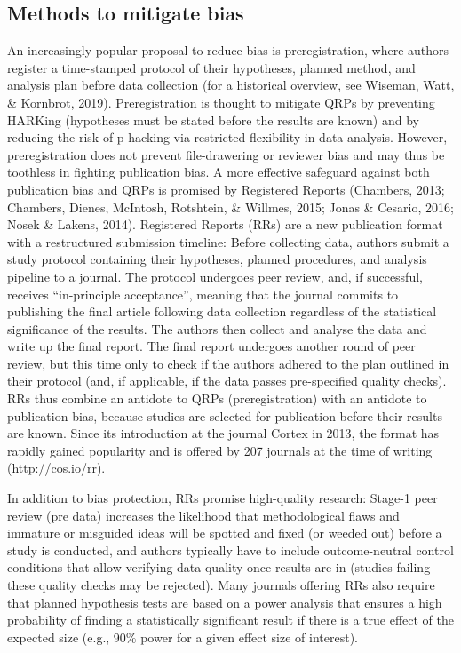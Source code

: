 \documentclass[british,,man,floatsintext]{apa6}
\begin{document}
\hypertarget{methods-to-mitigate-bias}{%
\subsection{Methods to mitigate bias}\label{methods-to-mitigate-bias}}

An increasingly popular proposal to reduce bias is preregistration, where authors register a time-stamped protocol of their hypotheses, planned method, and analysis plan before data collection (for a historical overview, see Wiseman, Watt, \& Kornbrot, 2019).
Preregistration is thought to mitigate QRPs by preventing HARKing (hypotheses must be stated before the results are known) and by reducing the risk of p-hacking via restricted flexibility in data analysis.
However, preregistration does not prevent file-drawering or reviewer bias and may thus be toothless in fighting publication bias.
A more effective safeguard against both publication bias and QRPs is promised by Registered Reports (Chambers, 2013; Chambers, Dienes, McIntosh, Rotshtein, \& Willmes, 2015; Jonas \& Cesario, 2016; Nosek \& Lakens, 2014).
Registered Reports (RRs) are a new publication format with a restructured submission timeline:
Before collecting data, authors submit a study protocol containing their hypotheses, planned procedures, and analysis pipeline to a journal.
The protocol undergoes peer review, and, if successful, receives \enquote{in-principle acceptance}, meaning that the journal commits to publishing the final article following data collection regardless of the statistical significance of the results.
The authors then collect and analyse the data and write up the final report.
The final report undergoes another round of peer review, but this time only to check if the authors adhered to the plan outlined in their protocol (and, if applicable, if the data passes pre-specified quality checks).
RRs thus combine an antidote to QRPs (preregistration) with an antidote to publication bias, because studies are selected for publication before their results are known.
Since its introduction at the journal Cortex in 2013, the format has rapidly gained popularity and is offered by 207 journals at the time of writing (\url{http://cos.io/rr}).

In addition to bias protection, RRs promise high-quality research: Stage-1 peer review (pre data) increases the likelihood that methodological flaws and immature or misguided ideas will be spotted and fixed (or weeded out) before a study is conducted, and authors typically have to include outcome-neutral control conditions that allow verifying data quality once results are in (studies failing these quality checks may be rejected).
Many journals offering RRs also require that planned hypothesis tests are based on a power analysis that ensures a high probability of finding a statistically significant result if there is a true effect of the expected size (e.g., \(90\%\) power for a given effect size of interest).
\end{document}
